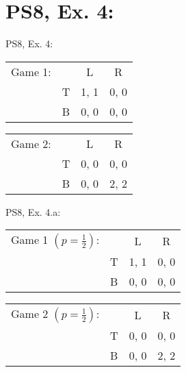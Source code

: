 \section{PS8, Ex. 4: }

\begin{frame}{PS8, Ex. 4: }
    \begin{table}
      \begin{tabular}{ll|c|c|}
        \multicolumn{1}{c}{Game 1:} & \multicolumn{1}{c}{} & \multicolumn{1}{c}{L} & \multicolumn{1}{c}{R} \\\cline{3-4}
        & T & 1, 1 & 0, 0 \\\cline{3-4}
        & B & 0, 0 & 0, 0 \\\cline{3-4}
      \end{tabular}
      \quad\quad
      \begin{tabular}{ll|c|c|}
        \multicolumn{1}{c}{Game 2:} & \multicolumn{1}{c}{} & \multicolumn{1}{c}{L} & \multicolumn{1}{c}{R} \\\cline{3-4}
        & T & 0, 0 & 0, 0 \\\cline{3-4}
        & B & 0, 0 & 2, 2 \\\cline{3-4}
      \end{tabular}
    \end{table}
    \vfill\null
\end{frame}

\begin{frame}{PS8, Ex. 4.a: }
    \begin{table}
      \begin{tabular}{ll|c|c|}
        \multicolumn{1}{c}{Game 1 $(p=\frac{1}{2})$:} & \multicolumn{1}{c}{} & \multicolumn{1}{c}{L} & \multicolumn{1}{c}{R} \\\cline{3-4}
        & T & 1, 1 & 0, 0 \\\cline{3-4}
        & B & 0, 0 & 0, 0 \\\cline{3-4}
      \end{tabular}
      \quad\quad
      \begin{tabular}{ll|c|c|}
        \multicolumn{1}{c}{Game 2 $(p=\frac{1}{2})$:} & \multicolumn{1}{c}{} & \multicolumn{1}{c}{L} & \multicolumn{1}{c}{R} \\\cline{3-4}
        & T & 0, 0 & 0, 0 \\\cline{3-4}
        & B & 0, 0 & 2, 2 \\\cline{3-4}
      \end{tabular}
    \end{table}
  \begin{multicols}{2}
    \vfill\null\columnbreak
    \vfill\null\null
  \end{multicols}
\end{frame}
